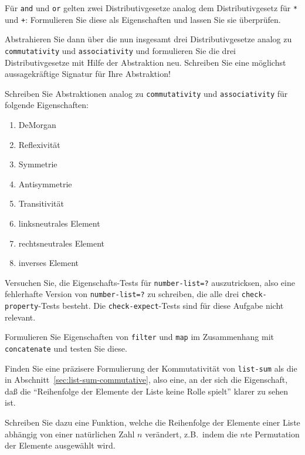 \begin{aufgabe}
  \label{aufgabe:boolean-distrib}
  Für \texttt{and} und \texttt{or} gelten zwei Distributivgesetze
  analog dem Distributivgesetz für \texttt{*} und \texttt{+}:
  Formulieren Sie diese als Eigenschaften und lassen Sie \drscheme{}
  sie überprüfen.

  Abstrahieren Sie dann über die nun insgesamt drei Distributivgesetze
  analog zu \texttt{commutativity} und \texttt{associativity} und
  formulieren Sie die drei Distributivgesetze mit Hilfe der
  Abstraktion neu.  Schreiben Sie eine möglichst aussagekräftige
  Signatur für Ihre Abstraktion!
\end{aufgabe}

\begin{aufgabe}  Schreiben Sie Abstraktionen analog zu \texttt{commutativity} und
  \texttt{associativity} für folgende Eigenschaften:
  \begin{enumerate}
  \item DeMorgan
  \item Reflexivität
  \item Symmetrie
  \item Antisymmetrie
  \item Transitivität
  \item linksneutrales Element
  \item rechtsneutrales Element
  \item inverses Element
  \end{enumerate}
\end{aufgabe}


\begin{aufgabe}
  Versuchen Sie, die Eigenschafts-Tests für \texttt{number-list=?}
  auszutricksen, also eine fehlerhafte Version von
  \texttt{number-list=?} zu schreiben, die alle drei
  \texttt{check-property}-Tests besteht.
  Die \texttt{check-expect}-Tests sind für diese Aufgabe nicht relevant.
\end{aufgabe}

\begin{aufgabe}
  Formulieren Sie Eigenschaften von \texttt{filter} und \texttt{map}
  im Zusammenhang mit \texttt{concatenate} und testen Sie diese.
\end{aufgabe}

\begin{aufgabe}
  Finden Sie eine präzisere Formulierung der Kommutativität von
  \texttt{list-sum} als die in
  Abschnitt~\ref{sec:list-sum-commutative}, also eine, an der sich die
  Eigenschaft, daß die "`Reihenfolge der Elemente der Liste keine
  Rolle spielt"' klarer zu sehen ist.

  Schreiben Sie dazu eine Funktion, welche die Reihenfolge der
  Elemente einer Liste abhängig von einer natürlichen Zahl $n$
  verändert, z.B.\ indem die $n$te Permutation der Elemente ausgewählt
  wird.
\end{aufgabe}

